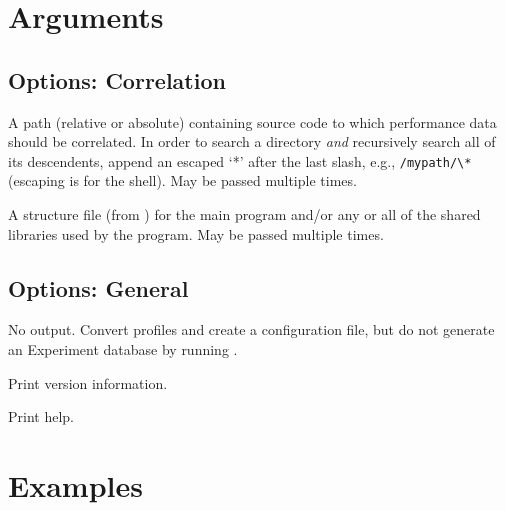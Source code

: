 \documentclass[english]{article}
\begin{document}
\section{Arguments}

\subsection{Options: Correlation}

\begin{Description}
\item[\OptArg{-I}{path}] A path (relative or absolute) containing source code to which performance data should be correlated.  In order to search a directory \emph{and} recursively search all of its descendents, append an escaped `*' after the last slash, e.g., \verb+/mypath/\*+ (escaping is for the shell). May be passed multiple times.
\item[\OptArg{-S}{struct-file}] A structure file (from ) for the main program and/or any or all of the shared libraries used by the program.  May be passed multiple times.
\end{Description}

\subsection{Options: General}

\begin{Description}
\item[\Opt{-n}] No  output.  Convert profiles and create a configuration file, but do not generate an Experiment database by running .
\item[\Opt{-V}] Print version information.
\item[\Opt{-h}] Print help.
\end{Description}

\section{Examples}

\end{document}
